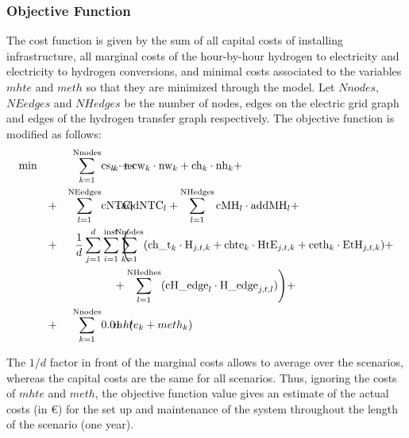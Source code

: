 \documentclass[english]{article}
\numberwithin{definition}{section}
\numberwithin{theorem}{section}
\numberwithin{problem}{section}
\begin{document}
\subsubsection{Objective Function}
The cost function is given by the sum of all capital costs of installing infrastructure, all marginal costs of the hour-by-hour hydrogen to electricity and electricity to hydrogen conversions, and minimal costs associated to the variables $mhte$ and $meth$ so that they are minimized through the model.
Let $Nnodes$, $NEedges$ and $NHedges$ be the number of nodes, edges on the electric grid graph and edges of the hydrogen transfer graph respectively. The objective function is modified as follows:
\begin{align*}
    \min \quad 
    &&\sum_{k=1}^{\text{Nnodes}}&\text{cs}_k \cdot \text{ns}\hspace{-3.5em}&&_k+\text{cw}_k \cdot \text{nw}_k + \text{ch}_k \cdot \text{nh}_k + \\
    &+& \sum_{l=1}^{\text{NEedges}}& \text{cNTC}_l \hspace{-3em}&&\cdot\text{addNTC}_l 
    + \sum_{l=1}^{\text{NHedges}} \text{cMH}_l\cdot \text{addMH}_l + \\   
    &+&\frac{1}{d}\sum_{j=1}^{d}&\sum_{i=1}^{\text{inst}} \Bigg( \hspace{-5em}&&
    \sum_{k=1}^{\text{Nnodes}} (\text{ch\_t}_k \cdot \text{H}_{j,t,k} + \text{chte}_k \cdot \text{HtE}_{j,t,k} + \text{ceth}_k \cdot \text{EtH}_{j,t,k}) + \\
    &&&\hspace{-2em}&&+\sum_{l=1}^{\text{NHedhes}} (\text{cH\_edge}_l\cdot\text{H\_edge}_{j,t,l}) \Bigg) + \\
    &+&\sum_{k=1}^{\text{Nnodes}}& 0.01\cdot(\hspace{-2.8em}&&mhte_k+meth_k)
\end{align*}

The $1/d$ factor in front of the marginal costs allows to average over the scenarios, whereas the capital costs are the same for all scenarios. Thus, ignoring the costs of $mhte$ and $meth$, the objective function value gives an estimate of the actual costs (in \euro) for the set up and maintenance of the system throughout the length of the scenario (one year). 
\end{document}
